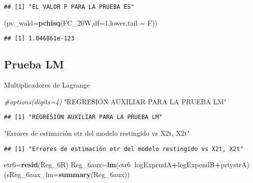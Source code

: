 \documentclass[
]{article}
\newenvironment{Shaded}{\begin{snugshade}}{\end{snugshade}}
\newcommand{\CommentTok}[1]{\textcolor[rgb]{0.56,0.35,0.01}{\textit{#1}}}
\newcommand{\DataTypeTok}[1]{\textcolor[rgb]{0.13,0.29,0.53}{#1}}
\newcommand{\DecValTok}[1]{\textcolor[rgb]{0.00,0.00,0.81}{#1}}
\newcommand{\KeywordTok}[1]{\textcolor[rgb]{0.13,0.29,0.53}{\textbf{#1}}}
\newcommand{\NormalTok}[1]{#1}
\newcommand{\OperatorTok}[1]{\textcolor[rgb]{0.81,0.36,0.00}{\textbf{#1}}}
\newcommand{\StringTok}[1]{\textcolor[rgb]{0.31,0.60,0.02}{#1}}
\begin{document}
\begin{verbatim}
## [1] "EL VALOR P PARA LA PRUEBA ES"
\end{verbatim}

\begin{Shaded}
\begin{Highlighting}[]
\NormalTok{(}\DataTypeTok{pv_wald=}\KeywordTok{pchisq}\NormalTok{(FC_20W,}\DataTypeTok{df=}\DecValTok{1}\NormalTok{,}\DataTypeTok{lower.tail =}\NormalTok{ F))}
\end{Highlighting}
\end{Shaded}

\begin{verbatim}
## [1] 1.046861e-123
\end{verbatim}

\hypertarget{prueba-lm}{%
\subsection{Prueba LM}\label{prueba-lm}}

Multiplicadores de Lagrange

\begin{Shaded}
\begin{Highlighting}[]
\CommentTok{#options(digits=4)}
\StringTok{"REGRESIÓN AUXILIAR PARA LA PRUEBA LM"}
\end{Highlighting}
\end{Shaded}

\begin{verbatim}
## [1] "REGRESIÓN AUXILIAR PARA LA PRUEBA LM"
\end{verbatim}

\begin{Shaded}
\begin{Highlighting}[]
\StringTok{"Errores de estimación etr del modelo restingido vs X2t, X2t"}
\end{Highlighting}
\end{Shaded}

\begin{verbatim}
## [1] "Errores de estimación etr del modelo restingido vs X2t, X2t"
\end{verbatim}

\begin{Shaded}
\begin{Highlighting}[]
\NormalTok{etr6=}\KeywordTok{resid}\NormalTok{(Reg_6R)}
\NormalTok{Reg_6aux=}\KeywordTok{lm}\NormalTok{(etr6}\OperatorTok{~}\NormalTok{logExpendA}\OperatorTok{+}\NormalTok{logExpendB}\OperatorTok{+}\NormalTok{prtystrA)}
\NormalTok{(}\DataTypeTok{sReg_6aux_lm=}\KeywordTok{summary}\NormalTok{(Reg_6aux))}
\end{Highlighting}
\end{Shaded}
\end{document}
